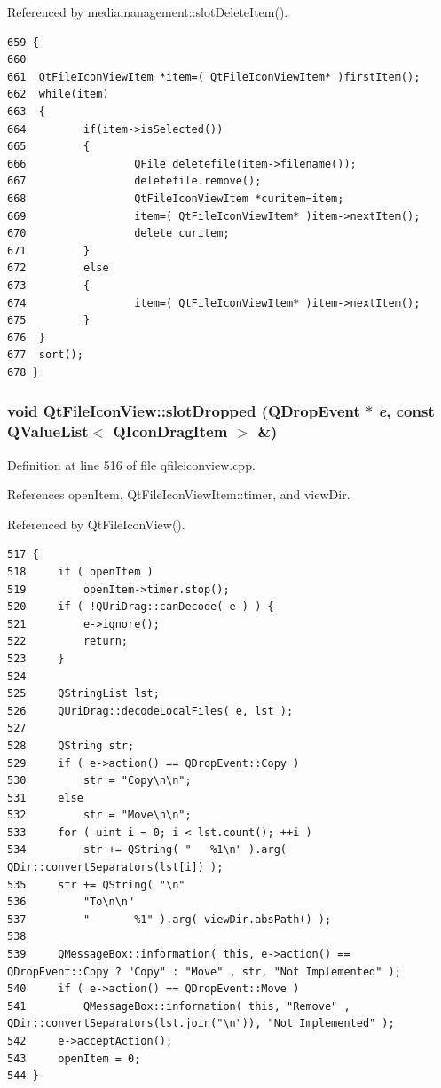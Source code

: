 Referenced by mediamanagement::slot\-Delete\-Item().



\footnotesize\begin{verbatim}659 {
660 
661  QtFileIconViewItem *item=( QtFileIconViewItem* )firstItem();
662  while(item)
663  {
664         if(item->isSelected())
665         {
666                 QFile deletefile(item->filename());
667                 deletefile.remove();
668                 QtFileIconViewItem *curitem=item;
669                 item=( QtFileIconViewItem* )item->nextItem();
670                 delete curitem;
671         }
672         else
673         {
674                 item=( QtFileIconViewItem* )item->nextItem();
675         }
676  }
677  sort();
678 }
\end{verbatim}\normalsize 
{}
\subsubsection{\setlength{\rightskip}{0pt plus 5cm}void Qt\-File\-Icon\-View::slot\-Dropped (QDrop\-Event $\ast$ {\em e}, const QValue\-List$<$ QIcon\-Drag\-Item $>$ \&)\hspace{0.3cm}{\tt  [protected, slot]}}\label{classQtFileIconView_QtFileIconViewj2}




Definition at line 516 of file qfileiconview.cpp.

References open\-Item, Qt\-File\-Icon\-View\-Item::timer, and view\-Dir.

Referenced by Qt\-File\-Icon\-View().



\footnotesize\begin{verbatim}517 {
518     if ( openItem )
519         openItem->timer.stop();
520     if ( !QUriDrag::canDecode( e ) ) {
521         e->ignore();
522         return;
523     }
524 
525     QStringList lst;
526     QUriDrag::decodeLocalFiles( e, lst );
527 
528     QString str;
529     if ( e->action() == QDropEvent::Copy )
530         str = "Copy\n\n";
531     else
532         str = "Move\n\n";
533     for ( uint i = 0; i < lst.count(); ++i )
534         str += QString( "   %1\n" ).arg( QDir::convertSeparators(lst[i]) );
535     str += QString( "\n"
536         "To\n\n"
537         "       %1" ).arg( viewDir.absPath() );
538 
539     QMessageBox::information( this, e->action() == QDropEvent::Copy ? "Copy" : "Move" , str, "Not Implemented" );
540     if ( e->action() == QDropEvent::Move )
541         QMessageBox::information( this, "Remove" , QDir::convertSeparators(lst.join("\n")), "Not Implemented" );
542     e->acceptAction();
543     openItem = 0;
544 }
\end{verbatim}\normalsize 
{}
